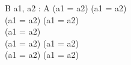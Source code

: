 \begin{zed}
	[A]
\end{zed}

\begin{schema}{B}
	a1, a2 : A
\where
	(a1 = a2) \implies (a1 = a2) \\
	(a1 = a2) \iff (a1 = a2) \\
	\lnot (a1 = a2) \\
	(a1 = a2) \land (a1 = a2) \\
	(a1 = a2) \lor (a1 = a2) \\
\end{schema}